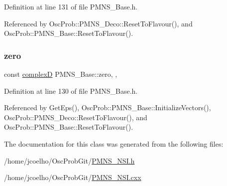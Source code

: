 Definition at line 131 of file P\+M\+N\+S\+\_\+\+Base.\+h.



Referenced by Osc\+Prob\+::\+P\+M\+N\+S\+\_\+\+Deco\+::\+Reset\+To\+Flavour(), and Osc\+Prob\+::\+P\+M\+N\+S\+\_\+\+Base\+::\+Reset\+To\+Flavour().

\mbox{\label{classOscProb_1_1PMNS__Base_a05e595848c2521dc795efa7645728b94}} 
\subsubsection{\texorpdfstring{zero}{zero}}
{\footnotesize\ttfamily const \hyperlink{EigenPoint_8h_a67ca8e107e20610c3fff78d5e726ece0}{complexD} P\+M\+N\+S\+\_\+\+Base\+::zero\hspace{0.3cm}{\ttfamily [static]}, {\ttfamily [protected]}, {\ttfamily [inherited]}}



Definition at line 130 of file P\+M\+N\+S\+\_\+\+Base.\+h.



Referenced by Get\+Eps(), Osc\+Prob\+::\+P\+M\+N\+S\+\_\+\+Base\+::\+Initialize\+Vectors(), Osc\+Prob\+::\+P\+M\+N\+S\+\_\+\+Deco\+::\+Reset\+To\+Flavour(), and Osc\+Prob\+::\+P\+M\+N\+S\+\_\+\+Base\+::\+Reset\+To\+Flavour().



The documentation for this class was generated from the following files\+:\begin{DoxyCompactItemize}
\item 
/home/jcoelho/\+Osc\+Prob\+Git/\hyperlink{PMNS__NSI_8h}{P\+M\+N\+S\+\_\+\+N\+S\+I.\+h}\item 
/home/jcoelho/\+Osc\+Prob\+Git/\hyperlink{PMNS__NSI_8cxx}{P\+M\+N\+S\+\_\+\+N\+S\+I.\+cxx}\end{DoxyCompactItemize}
